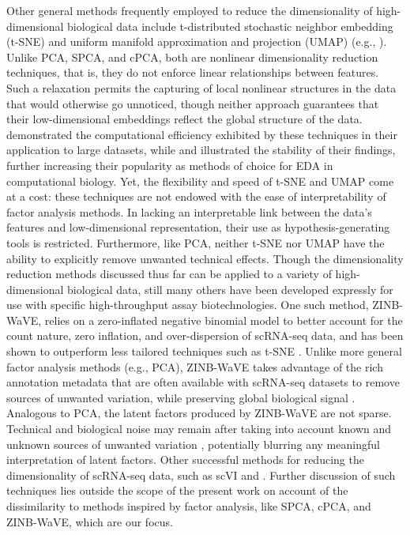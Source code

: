 Other general methods frequently employed to reduce the dimensionality of high-dimensional biological data include t-distributed stochastic neighbor embedding (t-SNE) \citep{Maaten08visualizingdata} and uniform manifold approximation and projection (UMAP) \citep{McInnes2018} (e.g., \citep{Amir2013, Becht2019}). Unlike PCA, SPCA, and cPCA, both are nonlinear dimensionality reduction techniques, that is, they do not enforce linear relationships between features. Such a relaxation permits the capturing of local nonlinear structures in the data that would otherwise go unnoticed, though neither approach guarantees that their low-dimensional embeddings reflect the global structure of the data. \citet{Becht2019} demonstrated the computational efficiency exhibited by these techniques in their application to large datasets, while \citet{Amir2013} and \citet{Becht2019} illustrated the stability of their findings, further increasing their popularity as methods of choice for EDA in computational biology. Yet, the flexibility and speed of t-SNE and UMAP come at a cost:  these techniques are not endowed with the ease of interpretability of factor analysis methods. In lacking an interpretable link between the data's features and low-dimensional representation, their use as hypothesis-generating tools is restricted. Furthermore, like PCA, neither t-SNE nor UMAP have the ability to explicitly remove unwanted technical effects. 
Though the dimensionality reduction methods discussed thus far can be applied to a variety of high-dimensional biological data, still many others have been developed expressly for use with specific high-throughput assay biotechnologies. One such method, ZINB-WaVE, relies on a zero-inflated negative binomial model to better account for the count nature, zero inflation, and over-dispersion of scRNA-seq data, and has been shown to outperform less tailored techniques such as t-SNE \citep{risso2017zinb}. Unlike more general factor analysis methods (e.g., PCA), ZINB-WaVE takes advantage of the rich annotation metadata that are often available with scRNA-seq datasets to remove sources of unwanted variation, while preserving global biological signal \citep{risso2017zinb}. Analogous to PCA, the latent factors produced by ZINB-WaVE are not sparse. Technical and biological noise may remain after taking into account known and unknown sources of unwanted variation \citep{risso2017zinb}, potentially blurring any meaningful interpretation of latent factors. Other successful methods for reducing the dimensionality of scRNA-seq data, such as scVI \citep{Lopez2018} and . Further discussion of such techniques lies outside the scope of the present work on account of the dissimilarity to methods inspired by factor analysis, like SPCA, cPCA, and ZINB-WaVE, which are our focus.